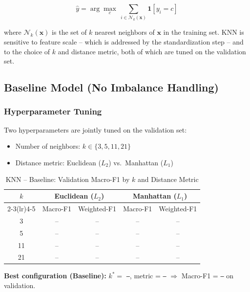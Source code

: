 \documentclass[12pt,a4paper]{article}
\begin{document}
\begin{equation}
    \hat{y} = \arg\max_{c}\ \sum_{i \in \mathcal{N}_k(\mathbf{x})} \mathbf{1}[y_i = c]
\end{equation}

where $\mathcal{N}_k(\mathbf{x})$ is the set of $k$ nearest neighbors of $\mathbf{x}$ in the training set. KNN is sensitive to feature scale -- which is addressed by the standardization step -- and to the choice of $k$ and distance metric, both of which are tuned on the validation set.

\subsection{Baseline Model (No Imbalance Handling)}

\subsubsection{Hyperparameter Tuning}

Two hyperparameters are jointly tuned on the validation set:
\begin{itemize}
    \item Number of neighbors: $k \in \{3, 5, 11, 21\}$
    \item Distance metric: Euclidean ($L_2$) vs.\ Manhattan ($L_1$)
\end{itemize}

\begin{table}[H]
    \centering
    \caption{KNN -- Baseline: Validation Macro-F1 by $k$ and Distance Metric}
    \label{tab:knn_baseline_tuning}
    \begin{tabular}{ccccc}
        \toprule
        \multirow{2}{*}{$k$} & \multicolumn{2}{c}{Euclidean ($L_2$)} & \multicolumn{2}{c}{Manhattan ($L_1$)} \\
        \cmidrule(lr){2-3}\cmidrule(lr){4-5}
         & Macro-F1 & Weighted-F1 & Macro-F1 & Weighted-F1 \\
        \midrule
        3  & -- & -- & -- & -- \\
        5  & -- & -- & -- & -- \\
        11 & -- & -- & -- & -- \\
        21 & -- & -- & -- & -- \\
        \bottomrule
    \end{tabular}
\end{table}

\noindent\textbf{Best configuration (Baseline):} $k^* =$ \texttt{--}, metric = \texttt{--} $\Rightarrow$ Macro-F1 = \texttt{--} on validation.
\end{document}
